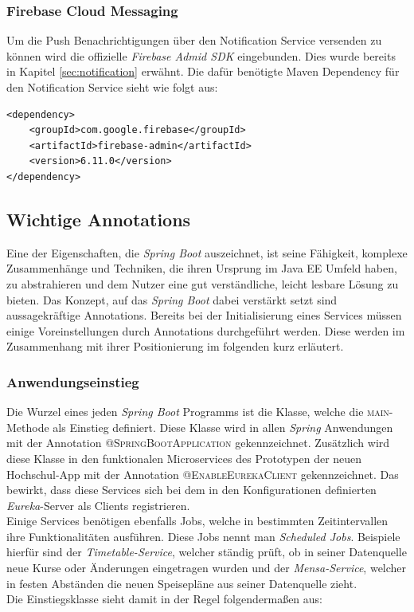 \subsubsection*{Firebase Cloud Messaging}
Um die Push Benachrichtigungen über den Notification Service versenden zu können wird die offizielle \textit{Firebase Admid \ac{SDK}} eingebunden. Dies wurde bereits in Kapitel \ref{sec:notification} erwähnt. Die dafür benötigte Maven Dependency für den Notification Service sieht wie folgt aus: 
\begin{lstlisting}[caption={FCM Dependencies}]
<dependency>
    <groupId>com.google.firebase</groupId>
    <artifactId>firebase-admin</artifactId>
    <version>6.11.0</version>
</dependency>
\end{lstlisting}

\subsection*{Wichtige Annotations}
\label{sec:annotations}

Eine der Eigenschaften, die \textit{Spring Boot} auszeichnet, ist seine Fähigkeit, komplexe Zusammenhänge und Techniken, die ihren Ursprung im Java \ac{EE} Umfeld haben, zu abstrahieren und dem Nutzer eine gut verständliche, leicht lesbare Lösung zu bieten. Das Konzept, auf das \textit{Spring Boot} dabei verstärkt setzt sind aussagekräftige Annotations. Bereits bei der Initialisierung eines Services müssen einige Voreinstellungen durch Annotations durchgeführt werden. Diese werden im Zusammenhang mit ihrer Positionierung im folgenden kurz erläutert.

\subsubsection*{Anwendungseinstieg}

Die Wurzel eines jeden \textit{Spring Boot} Programms ist die Klasse, welche die \textsc{main}-Methode als Einstieg definiert. Diese Klasse wird in allen \textit{Spring} Anwendungen mit der Annotation \textsc{@SpringBootApplication} gekennzeichnet. Zusätzlich wird diese Klasse in den funktionalen Microservices des Prototypen der neuen Hochschul-\ac{App} mit der Annotation \textsc{@EnableEurekaClient} gekennzeichnet. Das bewirkt, dass diese Services sich bei dem in den Konfigurationen definierten \textit{Eureka}-Server als Clients registrieren.\\
\linebreak
Einige Services benötigen ebenfalls Jobs, welche in bestimmten Zeitintervallen ihre Funktionalitäten ausführen. Diese Jobs nennt man \textit{Scheduled Jobs}. Beispiele hierfür sind der \textit{Timetable-Service}, welcher ständig prüft, ob in seiner Datenquelle neue Kurse oder Änderungen eingetragen wurden und der \textit{Mensa-Service}, welcher in festen Abständen die neuen Speisepläne aus seiner Datenquelle zieht. \\
\linebreak
Die Einstiegsklasse sieht damit in der Regel folgendermaßen aus:

